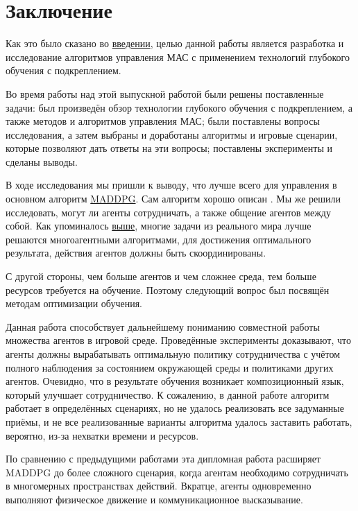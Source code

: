 \chapter*{Заключение} \label{ch-conclusion}

Как это было сказано во \hyperref[intro]{введении}, целью данной работы является разработка и исследование алгоритмов управления МАС с применением технологий глубокого обучения с подкреплением. 

Во время работы над этой выпускной работой были решены поставленные задачи: был произведён обзор технологии глубокого обучения с подкреплением, а также методов и алгоритмов управления МАС; были поставлены вопросы исследования, а затем выбраны и доработаны алгоритмы и игровые сценарии, которые позволяют дать ответы на эти вопросы; поставлены эксперименты и сделаны выводы.

В ходе исследования мы пришли к выводу, что лучше всего для управления в основном алгоритм \hyperref[acr:maddpg]{MADDPG}. Сам алгоритм хорошо описан \cite{lowe2017multiagent}. Мы же решили исследовать, могут ли агенты сотрудничать, а также общение агентов между собой. Как упоминалось \hyperref[ch2:ma-algs]{выше}, многие задачи из реального мира лучше решаются многоагентными алгоритмами, для достижения оптимального результата, действия агентов должны быть скоординированы.

С другой стороны, чем больше агентов и чем сложнее среда, тем больше ресурсов требуется на обучение. Поэтому следующий вопрос был посвящён методам оптимизации обучения.

Данная работа способствует дальнейшему пониманию совместной работы множества агентов в игровой среде. Проведённые эксперименты доказывают, что агенты должны вырабатывать оптимальную политику сотрудничества с учётом полного наблюдения за состоянием окружающей среды и политиками других агентов. Очевидно, что в результате обучения возникает композиционный язык, который улучшает сотрудничество. К сожалению, в данной работе алгоритм работает в определённых сценариях, но не удалось реализовать все задуманные приёмы, и не все реализованные варианты алгоритма удалось заставить работать, вероятно, из-за нехватки времени и ресурсов.

По сравнению с предыдущими работами эта дипломная работа расширяет MADDPG до более сложного сценария, когда агентам необходимо сотрудничать в многомерных пространствах действий. Вкратце, агенты одновременно выполняют физическое движение и коммуникационное высказывание.


